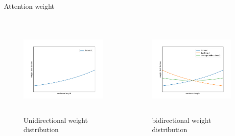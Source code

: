\documentclass[aspectratio=169]{beamer} %
\begin{document}
    \begin{frame}{Attention weight}
      \begin{columns}
      \begin{column}[t]{0.5\textwidth}
        \begin{figure}
        \includegraphics[width=6.4cm,height=4.8cm]{forward.png}
        \caption{Unidirectional weight distribution}
        \end{figure}
      \end{column}

      \begin{column}[t]{0.5\textwidth}
        \begin{figure}
        \includegraphics[width=6.4cm,height=4.8cm]{bidirectional.png}
        \caption{bidirectional weight distribution}
        \end{figure}
      \end{column}

      \end{columns}
    \end{frame}
\end{document}
